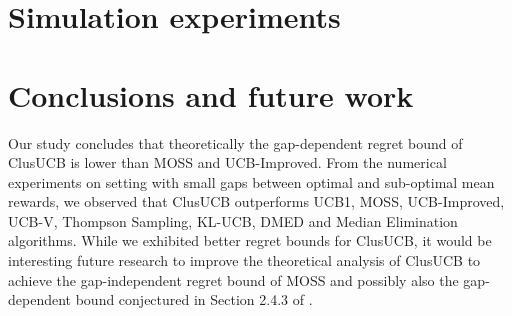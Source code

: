 \documentclass[twoside]{article}
\begin{document}
\section{Simulation experiments}
\label{sec:expts}



\section{Conclusions and future work}
\label{sec:conclusions}
Our study concludes that theoretically the gap-dependent regret bound of ClusUCB is lower than MOSS and UCB-Improved. From the numerical experiments on setting with small gaps between optimal and sub-optimal mean rewards, we observed that ClusUCB outperforms UCB1, MOSS, UCB-Improved, UCB-V, Thompson Sampling, KL-UCB, DMED and Median Elimination algorithms. 
While we exhibited better regret bounds for ClusUCB, it would be interesting future research to improve the theoretical analysis of ClusUCB to achieve the gap-independent regret bound of MOSS and possibly also the gap-dependent bound conjectured in Section 2.4.3 of \cite{bubeck2012regret}.
\end{document}
